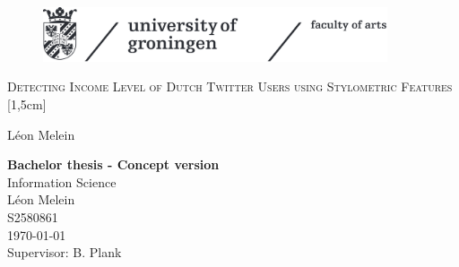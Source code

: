 \documentclass[
10pt, %
a4paper, %
oneside, %
headinclude,footinclude, %
] {book}%
\title{\normalfont\spacedallcaps{title}} %
\author{\spacedlowsmallcaps{author}} %
\date{} %
\begin{document}


\pagestyle{scrheadings} %



\hypersetup{pageanchor=false}
\begin{titlepage}
\thispagestyle{empty}
\begin{figure}[h!] %
\includegraphics[width=4in]{ruglogo} 
\end{figure}

\begin{center}
\vspace{30 mm}
\begingroup \linespread{1,75} \selectfont 
\textsc{\LARGE Detecting Income Level of Dutch Twitter Users using Stylometric Features}\\
[1,5cm]
\endgroup

L\'eon Melein\\[2,5cm]

\end{center}
\vfill
\textbf{Bachelor thesis - Concept version}\\  %
Information Science\\  %
L\'eon Melein\\
S2580861\\
\today\\
Supervisor: B. Plank
\end{titlepage}
\hypersetup{pageanchor=true}
\end{document}
